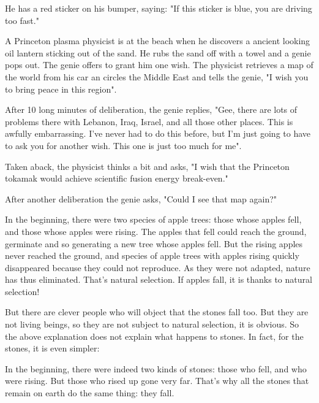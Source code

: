 He has a red sticker on his bumper, saying: "If this sticker is blue, you are driving too fast."
	\begin{center}\underline{\hspace{5 cm}}\end{center}

A Princeton plasma physicist is at the beach when he discovers a ancient looking oil lantern sticking out of the sand. He rubs the sand off with a towel and a genie pops out. The genie offers to grant him one wish. The physicist retrieves a map of the world from his car an circles the Middle East and tells the genie, "I wish you to bring peace in this region".

After 10 long minutes of deliberation, the genie replies, "Gee, there are lots of problems there with Lebanon, Iraq, Israel, and all those other places. This is awfully embarrassing. I've never had to do this before, but I'm just going to have to ask you for another wish. This one is just too much for me".

Taken aback, the physicist thinks a bit and asks, "I wish that the Princeton tokamak would achieve scientific fusion energy break-even."

After another deliberation the genie asks, "Could I see that map again?"	
	\begin{center}\underline{\hspace{5 cm}}\end{center}

In the beginning, there were two species of apple trees: those whose apples fell, and those whose apples were rising. The apples that fell could reach the ground, germinate and so generating a new tree whose apples fell. But the rising apples never reached the ground, and species of apple trees with apples rising quickly disappeared because they could not reproduce. As they were not adapted, nature has thus eliminated. That's natural selection. If apples fall, it is thanks to natural selection!

But there are clever people who will object that the stones fall too. But they are not living beings, so they are not subject to natural selection, it is obvious. So the above explanation does not explain what happens to stones. In fact, for the stones, it is even simpler:

In the beginning, there were indeed two kinds of stones: those who fell, and who were rising. But those who rised up gone very far. That's why all the stones that remain on earth do the same thing: they fall.

